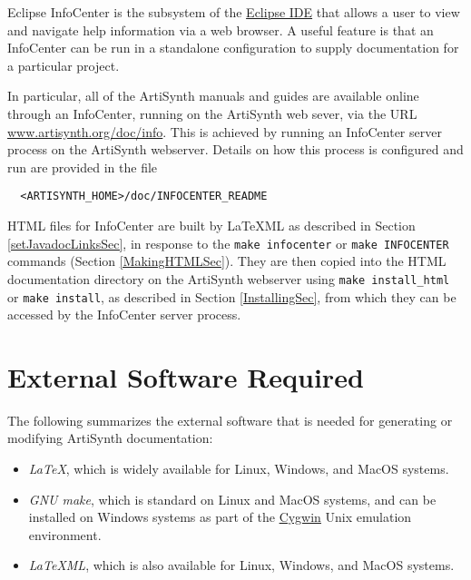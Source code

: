 \documentclass{article}
\begin{document}
Eclipse InfoCenter is the subsystem of the
\href{https://www.eclipse.org}{Eclipse IDE} that allows a user to view
and navigate help information via a web browser. A useful feature is
that an InfoCenter can be run in a standalone configuration to supply
documentation for a particular project. 

In particular, all of the ArtiSynth manuals and guides are available
online through an InfoCenter, running on the ArtiSynth web sever, via
the URL
\href{https://www.artisynth.org/doc/info}{www.artisynth.org/doc/info}.
This is achieved by running an InfoCenter server process on the
ArtiSynth webserver. Details on how this process is configured and run
are provided in the file
\begin{verbatim}
  <ARTISYNTH_HOME>/doc/INFOCENTER_README
\end{verbatim}

HTML files for InfoCenter are built by LaTeXML as described in
Section \ref{setJavadocLinksSec}, in response to the {\tt make
infocenter} or {\tt make INFOCENTER} commands (Section
\ref{MakingHTMLSec}).  They are then copied into the HTML
documentation directory on the ArtiSynth webserver using {\tt make
install\_html} or {\tt make install}, as described in Section
\ref{InstallingSec}, from which they can be accessed by the InfoCenter
server process.

\section{External Software Required}
\label{ExternalSoftwareSec}

The following summarizes the external software that
is needed for generating or modifying ArtiSynth
documentation:

\begin{itemize}

\item {\it LaTeX}, which is widely available for Linux, Windows,
and MacOS systems.

\item {\it GNU make}, which is standard on Linux and MacOS systems,
and can be installed on Windows systems as part of the 
\href{http://www.cygwin.com}{Cygwin} Unix emulation environment.

\item {\it LaTeXML}, which is also available for Linux, Windows, and
MacOS systems.  

\end{itemize}
\end{document}
